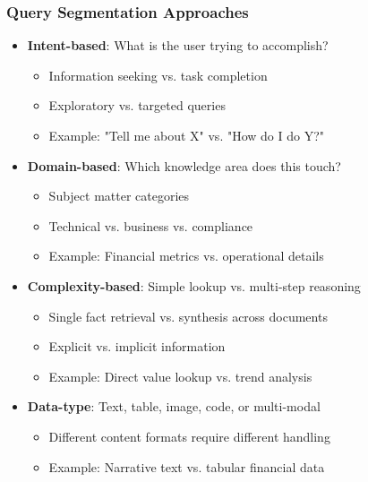 {    \begin{frame}
        \frametitle{Query Segmentation Approaches}
        \begin{itemize}
            \item \textbf{Intent-based}: What is the user trying to accomplish?
            \begin{itemize}
                \item Information seeking vs. task completion
                \item Exploratory vs. targeted queries
                \item Example: "Tell me about X" vs. "How do I do Y?"
            \end{itemize}
            \item \textbf{Domain-based}: Which knowledge area does this touch?
            \begin{itemize}
                \item Subject matter categories
                \item Technical vs. business vs. compliance
                \item Example: Financial metrics vs. operational details
            \end{itemize}
            \item \textbf{Complexity-based}: Simple lookup vs. multi-step reasoning
            \begin{itemize}
                \item Single fact retrieval vs. synthesis across documents
                \item Explicit vs. implicit information
                \item Example: Direct value lookup vs. trend analysis
            \end{itemize}
            \item \textbf{Data-type}: Text, table, image, code, or multi-modal
            \begin{itemize}
                \item Different content formats require different handling
                \item Example: Narrative text vs. tabular financial data
            \end{itemize}
        \end{itemize}
    \end{frame}

}

